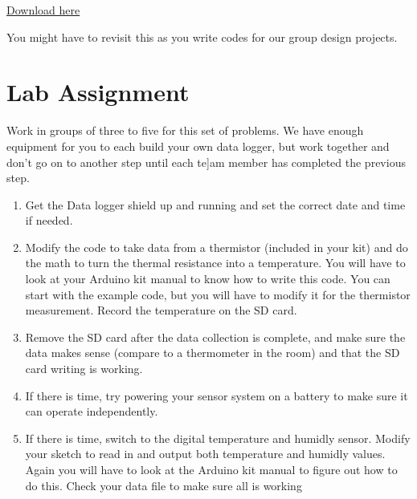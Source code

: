 \begin{center}
\href{https://raw.githubusercontent.com/rtlines/IntermediateLabPH250/main/Code/DataLogBME680_lines.ino}{Download here}
\end{center}

\noindent You might have to revisit this as you write codes for our group design projects.


\section{Lab Assignment}
	
	Work in groups of three to five for this set of problems. We have enough equipment for you to each build your own data logger, but work together and don't go on to another step until each te]am member has completed the previous step.
	
	\begin{enumerate}
		\item Get the Data logger shield up and running and set the correct date and time if needed.
		
		\item Modify the code to take data from a thermistor (included in your kit) and do the math to turn the thermal resistance into a temperature. You will have to look at your Arduino kit manual to know how to write this code. You can start with the example code, but you will have to modify it for the thermistor measurement. Record the temperature on the SD card.
		
		\item Remove the SD card after the data collection is complete, and make sure the data makes sense (compare to a thermometer in the room) and that the SD card writing is working.
		
		\item If there is time, try powering your sensor system on a battery to make sure it can operate independently.
		
		\item If there is time, switch to the digital temperature and humidly sensor. Modify your sketch to read in and output both temperature and humidly values. Again you will have to look at the Arduino kit manual to figure out how to do this. Check your data file to make sure all is working
	\end{enumerate}



